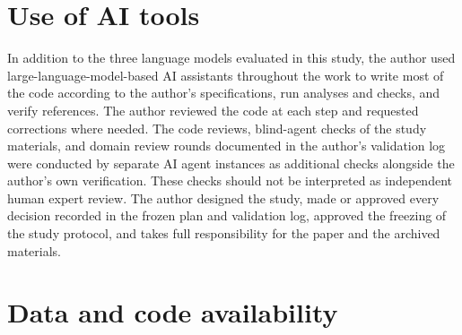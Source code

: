 \documentclass[11pt]{article}
\begin{document}
\section*{Use of AI tools}

In addition to the three language models evaluated in this study, the author used large-language-model-based AI
assistants throughout the work to write most of the code according to the author's specifications, run analyses and
checks, and verify references. The author reviewed the code at each step and requested corrections where needed. The
code reviews, blind-agent checks of the study materials, and domain review rounds documented in the author's validation log were
conducted by separate AI agent instances as additional checks alongside the author's own verification. These checks
should not be interpreted as independent human expert review. The author designed the study, made or approved every
decision recorded in the frozen plan and validation log, approved the freezing of the study protocol, and takes full
responsibility for the paper and the archived materials.

\section*{Data and code availability}
\end{document}
